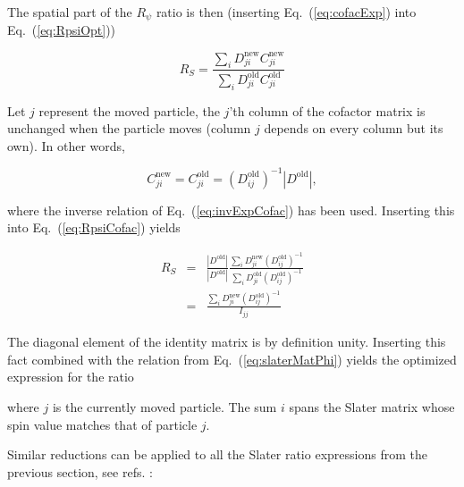 The spatial part of the $R_\psi$ ratio is then (inserting Eq.~(\ref{eq:cofacExp}) into Eq.~(\ref{eq:RpsiOpt}))

\begin{equation}
\label{eq:RpsiCofac}
 R_S = \frac{\sum_i D_{ji}^\mathrm{new}C_{ji}^\mathrm{new}}{\sum_i D_{ji}^\mathrm{old}C_{ji}^\mathrm{old}}
\end{equation}

Let $j$ represent the moved particle, the $j$'th column of the cofactor matrix is unchanged when the particle moves (column $j$ depends on every column but its own). In other words,

\begin{equation}
 C_{ji}^\mathrm{new} = C_{ji}^\mathrm{old} = (D^\mathrm{old}_{ij})^{-1}|D^\mathrm{old}|,
\end{equation}

where the inverse relation of Eq.~(\ref{eq:invExpCofac}) has been used. Inserting this into Eq.~(\ref{eq:RpsiCofac}) yields

\begin{eqnarray}
  R_S &=& \frac{|D^\mathrm{old}|}{|D^\mathrm{old}|}\frac{\sum_i D_{ji}^\mathrm{new}(D_{ij}^\mathrm{old})^{-1}}{\sum_i D_{ji}^\mathrm{old}(D_{ij}^\mathrm{old})^{-1}} \nonumber\\
         &=& \frac{\sum_i D_{ji}^\mathrm{new}(D_{ij}^\mathrm{old})^{-1}}{I_{jj}} \nonumber
\end{eqnarray}

The diagonal element of the identity matrix is by definition unity. Inserting this fact combined with the relation from Eq.~(\ref{eq:slaterMatPhi}) yields the optimized expression for the ratio


where $j$ is the currently moved particle. The sum $i$ spans the Slater matrix whose spin value matches that of particle $j$.


Similar reductions can be applied to all the Slater ratio expressions from the previous section, see refs. \cite{abInitioMC, morten}:


